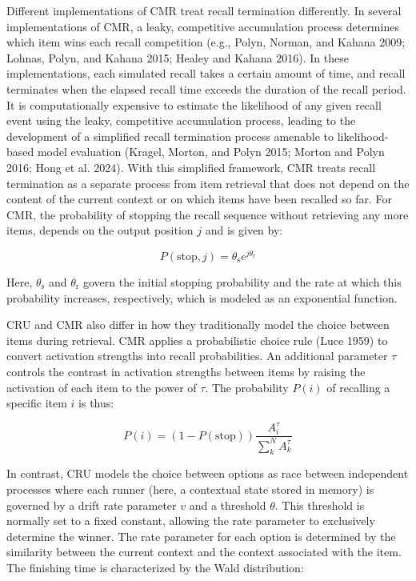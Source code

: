 \documentclass[
  letterpaper,
  11pt,
  english,
  singlespacing,
  headsepline]{MastersDoctoralThesis}
\begin{document}
Different implementations of CMR treat recall termination differently.
In several implementations of CMR, a leaky, competitive accumulation
process determines which item wins each recall competition (e.g., Polyn,
Norman, and Kahana 2009; Lohnas, Polyn, and Kahana 2015; Healey and
Kahana 2016). In these implementations, each simulated recall takes a
certain amount of time, and recall terminates when the elapsed recall
time exceeds the duration of the recall period. It is computationally
expensive to estimate the likelihood of any given recall event using the
leaky, competitive accumulation process, leading to the development of a
simplified recall termination process amenable to likelihood-based model
evaluation (Kragel, Morton, and Polyn 2015; Morton and Polyn 2016; Hong
et al. 2024). With this simplified framework, CMR treats recall
termination as a separate process from item retrieval that does not
depend on the content of the current context or on which items have been
recalled so far. For CMR, the probability of stopping the recall
sequence without retrieving any more items, depends on the output
position \(j\) and is given by:

\[
P(\text{stop}, j) = \theta_\text{s} e^{j\theta_\text{r}}
\]

Here, \(\theta_\text{s}\) and \(\theta_\text{r}\) govern the initial
stopping probability and the rate at which this probability increases,
respectively, which is modeled as an exponential function.

CRU and CMR also differ in how they traditionally model the choice
between items during retrieval. CMR applies a probabilistic choice rule
(Luce 1959) to convert activation strengths into recall probabilities.
An additional parameter \(\tau\) controls the contrast in activation
strengths between items by raising the activation of each item to the
power of \(\tau\). The probability \(P(i)\) of recalling a specific item
\(i\) is thus:

\[
P(i) = (1-P(\text{stop}))\frac{A^{\tau}_i}{\sum_{k}^{N}A^{\tau}_k}
\]

In contrast, CRU models the choice between options as race between
independent processes where each runner (here, a contextual state stored
in memory) is governed by a drift rate parameter \(v\) and a threshold
\(\theta\). This threshold is normally set to a fixed constant, allowing
the rate parameter to exclusively determine the winner. The rate
parameter for each option is determined by the similarity between the
current context and the context associated with the item. The finishing
time is characterized by the Wald distribution:
\end{document}
